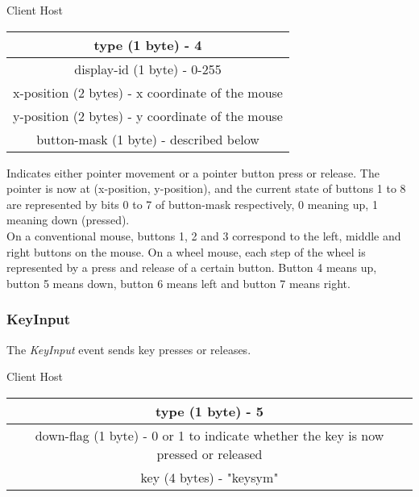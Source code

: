\documentclass{article}
\begin{document}
    \begin{center}
        Client \textrightarrow Host\\
        \begin{tabular}{|c|}
            \hline
            type (1 byte) - 4                                \\
            \hline
            display-id (1 byte) - 0-255                      \\
            \hline
            x-position (2 bytes) - x coordinate of the mouse \\
            \hline
            y-position (2 bytes) - y coordinate of the mouse \\
            \hline
            button-mask (1 byte) - described below           \\
            \hline
        \end{tabular}
    \end{center}

    Indicates either pointer movement or a pointer button press or release. The pointer is now at (x-position, y-position), and the current state of buttons 1 to 8 are represented by bits 0 to 7 of button-mask respectively, 0 meaning up, 1 meaning down (pressed).\\

    On a conventional mouse, buttons 1, 2 and 3 correspond to the left, middle and right buttons on the mouse. On a wheel mouse, each step of the wheel is represented by a press and release of a certain button. Button 4 means up, button 5 means down, button 6 means left and button 7 means right.

    \subsubsection{KeyInput}

    The \emph{KeyInput} event sends key presses or releases.

    \begin{center}
        Client \textrightarrow Host\\
        \begin{tabular}{|c|}
            \hline
            type (1 byte) - 5                                                                  \\
            \hline
            down-flag (1 byte) - 0 or 1 to indicate whether the key is now pressed or released \\
            \hline
            key (4 bytes) - "keysym"                                                           \\
            \hline
        \end{tabular}
    \end{center}
\end{document}
